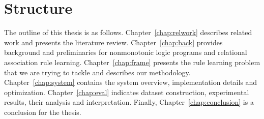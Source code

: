\section{Structure}

The outline of this thesis is as follows. Chapter~\ref{chap:relwork} describes related work and presents the literature review. Chapter~\ref{chap:back} provides background and preliminaries for nonmonotonic logic programs and relational association rule learning. Chapter~\ref{chap:frame} presents the rule learning problem that we are trying to tackle and describes our methodology. Chapter~\ref{chap:system} contains the system overview, implementation details and optimization. Chapter~\ref{chap:eval} indicates dataset construction, experimental results, their analysis and interpretation. Finally, Chapter~\ref{chap:conclusion} is a conclusion for the thesis.